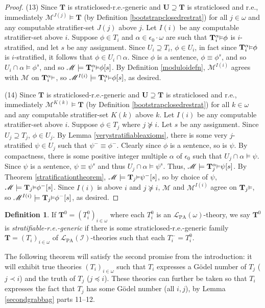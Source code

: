 \documentclass[reqno]{article}
\theoremstyle{definition}
\newtheorem{definition}[theorem]{Definition}
\def\L{\mathscr{L}}
\def\M{\mathscr{M}}
\def\T{\mathbf{T}}
\def\U{\mathbf{U}}
\def\LPA{\L_{\mathrm{PA}}}
\def\epom{\epsilon_0\cdot\omega}
\def\indset{\mathcal I}
\renewcommand{\Pr}[1]{\T_{#1}\mbox{\small${\vDash}$}}
\newcommand{\Prr}[2]{\T^{#1}_{#2}\mbox{\small${\vDash}$}}
\begin{document}
\begin{proof}
\item
(13)
Since $\T$ is straticlosed-r.e.-generic and $\U\supseteq \T$ is straticlosed and r.e.,
immediately $\M^{J(j)}\models\T$ (by Definition \ref{bootstrapclosedrestrat})
for all $j\in\omega$ and any computable stratifier-set $J(j)$ above $j$.
Let $I(i)$ be any computable stratifier-set above $i$.
Suppose $\phi\in T_i$ and $\alpha\in\epom$ are such that $\Prr\alpha i\phi$
is $i$-stratified, and let $s$ be any assignment.
Since $U_i\supseteq T_i$, $\phi\in U_i$, in fact since $\Prr\alpha i\phi$ is $i$-stratified,
it follows that $\phi\in U_i\cap\alpha$. Since $\phi$ is a sentence,
$\phi\equiv \phi^s$, and so
$U_i\cap\alpha\models\phi^s$, and so $\M\models \Prr\alpha i\phi[s]$.
By Definition \ref{moduloidefn}, $\M^{I(i)}$ agrees with $\M$ on $\Prr \alpha i$,
so $\M^{I(i)}\models \Prr\alpha i\phi[s]$, as desired.

\item
(14)
Since $\T$ is straticlosed-r.e.-generic and $\U\supseteq \T$ is straticlosed and r.e.,
immediately $\M^{K(k)}\models\T$ (by Definition \ref{bootstrapclosedrestrat})
for all $k\in\omega$ and any computable stratifier-set $K(k)$ above $k$.
Let $I(i)$ be any computable stratifier-set above $i$.
Suppose $\phi\in T_j$ where $j\not\succeq i$. Let $s$ be any assignment.
Since $U_j\supseteq T_j$, $\phi\in U_j$.
By Lemma \ref{verystratifiableaxioms}, there is some very $j$-stratified
$\psi\in U_j$ such that $\psi^-\equiv\phi^-$.
Clearly since $\phi$ is a sentence, so is $\psi$.
By compactness, there is some positive integer multiple $\alpha$ of $\epsilon_0$
such that $U_j\cap\alpha\models \psi$. Since $\psi$ is a sentence,
$\psi\equiv \psi^s$ and thus
$U_j\cap\alpha\models \psi^s$.
Thus, $\M\models\Prr\alpha j \psi[s]$.
By Theorem \ref{stratificationtheorem},
$\M\models\Pr j\psi^-[s]$, so by choice of $\psi$, $\M\models\Pr j\phi^-[s]$.
Since $I(i)$ is above $i$ and $j\not\succeq i$, $\M$ and $\M^{I(i)}$
agree on $\Pr j$, so $\M^{I(i)}\models \Pr j\phi^-[s]$, as desired.
\end{proof}

\begin{definition}
If $\T^0=(T^0_i)_{i\in\omega}$ where each $T^0_i$ is an $\LPA(\omega)$-theory,
we say $\T^0$ is \emph{stratifiable-r.e.-generic} if there is
some straticlosed-r.e.-generic family $\T=(T_i)_{i\in\omega}$ of
$\LPA(\indset)$-theories such that
each $T^-_i=T^0_i$.
\end{definition}

The following theorem will satisfy the second promise from the introduction:
it will exhibit true theories $(T_i)_{i\in\omega}$ such that $T_i$ expresses 
a G\"odel number of $T_j$ ($j\prec i$) and the truth of $T_j$ ($j\preceq 
i$).  These theories can further be taken so that $T_i$ expresses the fact 
that $T_j$ has some G\"odel number (all $i,j$), by Lemma \ref{secondgrabbag} parts 11--12.
\end{document}

